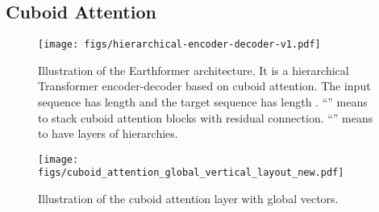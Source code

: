 \documentclass{article}
\begin{document}
\subsection{Cuboid Attention}



\begin{figure}[!tb]
    \centering
    \begin{minipage}{0.55\textwidth}
\hspace*{-0.5cm}
        \centering
\texttt{[image: figs/hierarchical-encoder-decoder-v1.pdf]}
        \caption{Illustration of the Earthformer architecture. It is a hierarchical Transformer encoder-decoder based on cuboid attention. The input sequence has length  and the target sequence has length . ``'' means to stack  cuboid attention blocks with residual connection. ``'' means to have  layers of hierarchies.} 
        \label{fig:enc_dec}
\end{minipage}
     \hspace*{0.5cm}
    \begin{minipage}{0.4\textwidth}
\centering
\texttt{[image: figs/cuboid\_attention\_global\_vertical\_layout\_new.pdf]}
\caption{Illustration of the cuboid attention layer with global vectors.}
        \label{fig:cuboid_attention}
\end{minipage}
\vspace{-1em}
\end{figure}
\end{document}
